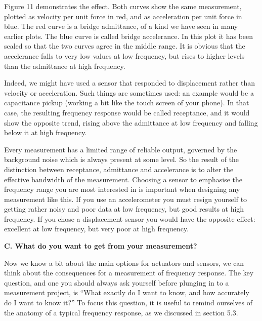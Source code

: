   Figure 11 demonstrates the effect. Both curves show the same measurement, 
  plotted as velocity per unit force in red, and as acceleration per unit force 
  in blue. The red curve is a bridge admittance, of a kind we have seen in many 
  earlier plots. The blue curve is called bridge accelerance. In this plot it 
  has been scaled so that the two curves agree in the middle range. It is 
  obvious that the accelerance falls to very low values at low frequency, but 
  rises to higher levels than the admittance at high frequency. 


  Indeed, we might have used a sensor that responded to displacement rather 
  than velocity or acceleration. Such things are sometimes used: an example 
  would be a capacitance pickup (working a bit like the touch screen of your 
  phone). In that case, the resulting frequency response would be called 
  receptance, and it would show the opposite trend, rising above the admittance 
  at low frequency and falling below it at high frequency. 

  Every measurement has a limited range of reliable output, governed by the 
  background noise which is always present at some level. So the result of the 
  distinction between receptance, admittance and accelerance is to alter the 
  effective bandwidth of the measurement. Choosing a sensor to emphasise the 
  frequency range you are most interested in is important when designing any 
  measurement like this. If you use an accelerometer you must resign yourself 
  to getting rather noisy and poor data at low frequency, but good results at 
  high frequency. If you chose a displacement sensor you would have the 
  opposite effect: excellent at low frequency, but very poor at high frequency. 

  \textbf{C. What do you want to get from your measurement?} 

  Now we know a bit about the main options for actuators and sensors, we can 
  think about the consequences for a measurement of frequency response. The key 
  question, and one you should always ask yourself before plunging in to a 
  measurement project, is “What exactly do I want to know, and how accurately 
  do I want to know it?” To focus this question, it is useful to remind 
  ourselves of the anatomy of a typical frequency response, as we discussed in 
  section 5.3. 

